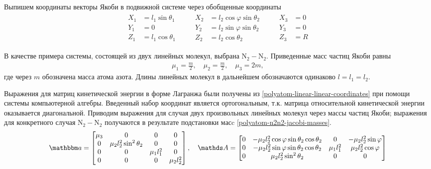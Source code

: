Выпишем координаты векторы Якоби в подвижной системе через обобщенные координаты 
\begin{gather}
    \begin{aligned}
        X_1 &= l_1 \sin \theta_1 \\
        Y_1 &= 0 \\
        Z_1 &= l_1 \cos \theta_1 
    \end{aligned} \qquad
    \begin{aligned}
        X_2 &= l_2 \cos \varphi \sin \theta_2 \\
        Y_2 &= l_2 \sin \varphi \sin \theta_2 \\
        Z_2 &= l_2 \cos \theta_2
    \end{aligned} \qquad
    \begin{aligned}
        X_3 &= 0 \\
        Y_3 &= 0 \\
        Z_3 &= R
    \end{aligned} \label{polyatom-linear-linear-coordinates}
\end{gather}

В качестве примера системы, состоящей из двух линейных молекул, выбрана N$_2-$N$_2$. Приведенные масс частиц Якоби равны
\begin{gather}
    \mu_1 = \frac{m}{2}, \quad \mu_2 = \frac{m}{2}, \quad \mu_3 = 2m, \label{polyatom-n2n2-jacobi-masses}
\end{gather}
%
где через $m$ обозначена масса атома азота. Длины линейных молекул в дальнейшем обозначаются одинаково $l = l_1 = l_2$.

Выражения для матриц кинетической энергии в форме Лагранжа были получены из \eqref{polyatom-linear-linear-coordinates} при помощи системы компьютерной алгебры. Введенный набор координат является ортогональным, т.к. матрица относительной кинетической энергии оказывается диагональной. Приводим выражения для случая двух произвольных линейных молекул через массы частиц Якоби; выражения для конкретного случая N$_2-$N$_2$ получаются в результате подстановки масc \eqref{polyatom-n2n2-jacobi-masses}.  
\begin{gather}
\bba = 
\begin{bmatrix}
\mu_3 & 0 & 0 & 0 \\
0 & \mu_2 l_2^2 \sin^2 \theta_2 & 0 & 0 \\
0 & 0 & \mu_1 l_1^2 & 0 \\
0 & 0 & 0 & \mu_2 l_2^2 \\ 
\end{bmatrix}, \quad  
\bbA = 
\begin{bmatrix}
0 & -\mu_2 l_2^2 \cos \varphi \sin \theta_2 \cos \theta_2 & 0 & -\mu_2 l_2^2 \sin \varphi  \\
0 & -\mu_2 l_2^2 \sin \varphi \sin \theta_2 \cos \theta_2 & \mu_1 l_1^2 & \mu_2 l_2^2 \cos \varphi \\
0 &  \mu_2 l_2^2 \sin^2 \theta_2 & 0 & 0
\end{bmatrix} \notag 
\end{gather}

